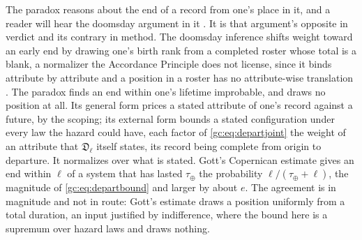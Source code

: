 \begin{remark}
\label{gc:rem:departuresnotdoomsday}
The paradox reasons about the end of a record from one's place in it,
and a reader will hear the doomsday argument in it \cite{Leslie96}. It
is that argument's opposite in verdict and its contrary in method. The
doomsday inference shifts weight toward an early end by drawing one's
birth rank from a completed roster whose total is a blank, a normalizer
the Accordance Principle does not license, since it binds attribute by
attribute and a position in a roster has no attribute-wise translation
\cite{Nexus}. The paradox finds an end within one's lifetime improbable,
and draws no position at all. Its general form prices a stated attribute
of one's record against a future, by the scoping; its external form
bounds a stated configuration under every law the hazard could have,
each factor of \eqref{gc:eq:departjoint} the weight of an attribute that
$\mathfrak D_\ell$ itself states, its record being complete from origin
to departure. It normalizes over what is stated. Gott's Copernican
estimate \cite{Got93} gives an end within $\ell$ of a system that has
lasted $\tau_\oplus$ the probability $\ell/(\tau_\oplus+\ell)$, the
magnitude of \eqref{gc:eq:departbound} and larger by about $e$. The
agreement is in magnitude and not in route: Gott's estimate draws a
position uniformly from a total duration, an input justified by
indifference, where the bound here is a supremum over hazard laws and
draws nothing.
\end{remark}


